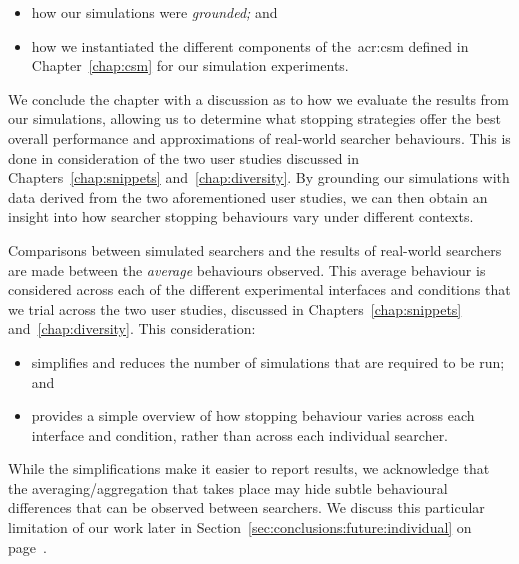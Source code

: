 \begin{itemize}
    \item{how our simulations were \emph{grounded;} and}
    \item{how we instantiated the different components of the~\gls{acr:csm} defined in Chapter~\ref{chap:csm} for our simulation experiments.}
\end{itemize}

We conclude the chapter with a discussion as to how we evaluate the results from our simulations, allowing us to determine what stopping strategies offer the best overall performance and approximations of real-world searcher behaviours. This is done in consideration of the two user studies discussed in Chapters~\ref{chap:snippets} and~\ref{chap:diversity}. By grounding our simulations with data derived from the two aforementioned user studies, we can then obtain an insight into how searcher stopping behaviours vary under different contexts.

 Comparisons between simulated searchers and the results of real-world searchers are made between the \emph{average} behaviours observed. This average behaviour is considered across each of the different experimental interfaces and conditions that we trial across the two user studies, discussed in Chapters~\ref{chap:snippets} and~\ref{chap:diversity}. This consideration:

\begin{itemize}
    \item{simplifies and reduces the number of simulations that are required to be run; and}
    \item{provides a simple overview of how stopping behaviour varies across each interface and condition, rather than across each individual searcher.}
\end{itemize}

While the simplifications make it easier to report results, we acknowledge that the averaging/aggregation that takes place may hide subtle behavioural differences that can be observed between searchers. We discuss this particular limitation of our work later in Section~\ref{sec:conclusions:future:individual} on page~\pageref{sec:conclusions:future:individual}.

